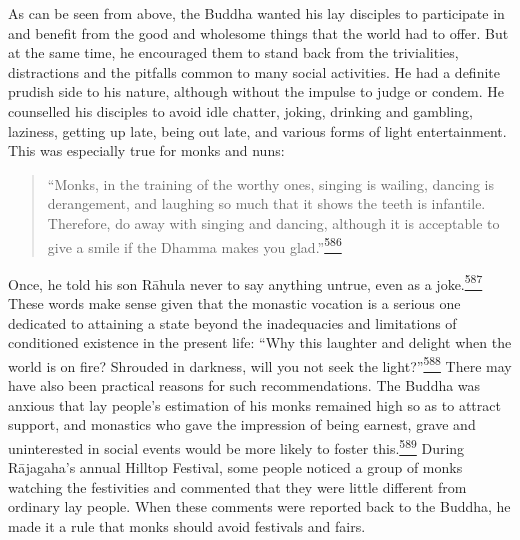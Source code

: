 As can be seen from above, the Buddha wanted his lay disciples to
participate in and benefit from the good and wholesome things that the
world had to offer. But at the same time, he encouraged them to stand
back from the trivialities, distractions and the pitfalls common to many
social activities. He had a definite prudish side to his nature,
although without the impulse to judge or condem. He counselled his
disciples to avoid idle chatter, joking, drinking and gambling,
laziness, getting up late, being out late, and various forms of light
entertainment. This was especially true for monks and nuns:

\begin{quote}
``Monks, in the training of the worthy ones, singing is wailing, dancing
is derangement, and laughing so much that it shows the teeth is
infantile. Therefore, do away with singing and dancing, although it is
acceptable to give a smile if the Dhamma makes you
glad.''\label{footprints_split_015.html_fnref586}\hyperref[footprints_split_025.htmlux5cux23fn586]{\textsuperscript{586}}
\end{quote}

Once, he told his son Rāhula never to say anything untrue, even as a
joke.\label{footprints_split_015.html_fnref587}\hyperref[footprints_split_025.htmlux5cux23fn587]{\textsuperscript{587}}
These words make sense given that the monastic vocation is a serious one
dedicated to attaining a state beyond the inadequacies and limitations
of conditioned existence in the present life: ``Why this laughter and
delight when the world is on fire? Shrouded in darkness, will you not
seek the
light?''\label{footprints_split_015.html_fnref588}\hyperref[footprints_split_025.htmlux5cux23fn588]{\textsuperscript{588}}
There may have also been practical reasons for such recommendations. The
Buddha was anxious that lay people's estimation of his monks remained
high so as to attract support, and monastics who gave the impression of
being earnest, grave and uninterested in social events would be more
likely to foster
this.\label{footprints_split_015.html_fnref589}\hyperref[footprints_split_025.htmlux5cux23fn589]{\textsuperscript{589}}
During Rājagaha's annual Hilltop Festival, some people noticed a group
of monks watching the festivities and commented that they were little
different from ordinary lay people. When these comments were reported
back to the Buddha, he made it a rule that monks should avoid festivals
and fairs.

